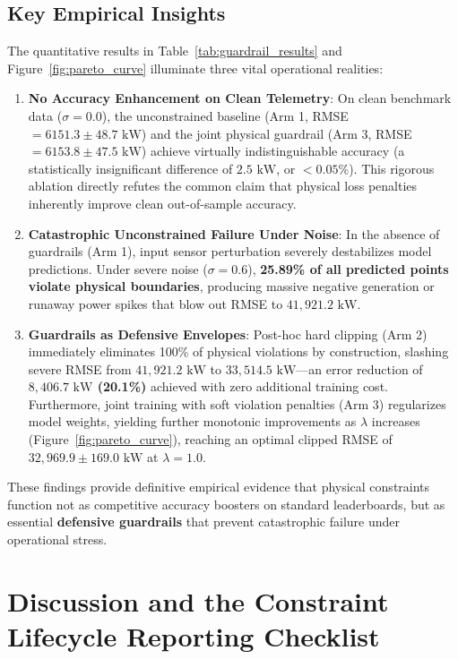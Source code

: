 \documentclass[preprint,3p,times]{elsarticle}
\begin{document}
\subsection{Key Empirical Insights}
The quantitative results in Table~\ref{tab:guardrail_results} and Figure~\ref{fig:pareto_curve} illuminate three vital operational realities:
\begin{enumerate}[label=(\arabic*)]
    \item \textbf{No Accuracy Enhancement on Clean Telemetry}: On clean benchmark data ($\sigma=0.0$), the unconstrained baseline (Arm 1, RMSE $= 6151.3 \pm 48.7\text{ kW}$) and the joint physical guardrail (Arm 3, RMSE $= 6153.8 \pm 47.5\text{ kW}$) achieve virtually indistinguishable accuracy (a statistically insignificant difference of $2.5\text{ kW}$, or $< 0.05\%$). This rigorous ablation directly refutes the common claim that physical loss penalties inherently improve clean out-of-sample accuracy.
    \item \textbf{Catastrophic Unconstrained Failure Under Noise}: In the absence of guardrails (Arm 1), input sensor perturbation severely destabilizes model predictions. Under severe noise ($\sigma=0.6$), \textbf{25.89\% of all predicted points violate physical boundaries}, producing massive negative generation or runaway power spikes that blow out RMSE to $41,921.2\text{ kW}$.
    \item \textbf{Guardrails as Defensive Envelopes}: Post-hoc hard clipping (Arm 2) immediately eliminates 100\% of physical violations by construction, slashing severe RMSE from $41,921.2\text{ kW}$ to $33,514.5\text{ kW}$---an error reduction of \textbf{$8,406.7\text{ kW}$ (20.1\%)} achieved with zero additional training cost. Furthermore, joint training with soft violation penalties (Arm 3) regularizes model weights, yielding further monotonic improvements as $\lambda$ increases (Figure~\ref{fig:pareto_curve}), reaching an optimal clipped RMSE of $32,969.9 \pm 169.0\text{ kW}$ at $\lambda=1.0$.
\end{enumerate}
These findings provide definitive empirical evidence that physical constraints function not as competitive accuracy boosters on standard leaderboards, but as essential \textbf{defensive guardrails} that prevent catastrophic failure under operational stress.

\section{Discussion and the Constraint Lifecycle Reporting Checklist}
\label{sec:discussion}
\end{document}
